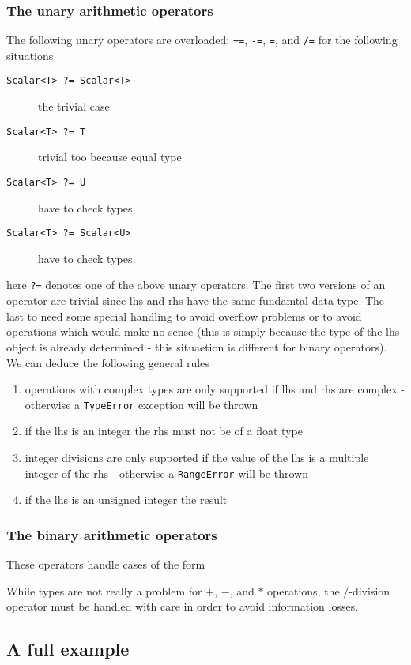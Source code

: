 \subsubsection{The unary arithmetic operators}
The following unary operators are overloaded: {\tt +=}, {\tt -=}, {\tt *=}, and
{\tt /=} for the following situations
\begin{description}
\item[{\tt Scalar<T> ?= Scalar<T>}] the trivial case 
\item[{\tt Scalar<T> ?= T}] trivial too because equal type
\item[{\tt Scalar<T> ?= U}] have to check types
\item[{\tt Scalar<T> ?= Scalar<U>}] have to check types
\end{description}
here {\tt ?=} denotes one of the above unary operators. The first two versions
of an operator are trivial since lhs and rhs have the same fundamtal data
type. The last to need some special handling to avoid overflow problems or 
to avoid operations which would make no sense (this is simply because the 
type of the lhs object is already determined - this situaetion is different 
for binary operators).
We can deduce the following general rules
\begin{enumerate}
  \item operations with complex types are only supported if lhs and rhs are
  complex - otherwise a {\tt TypeError} exception will be thrown
  \item if the lhs is an integer the rhs must not be of a float type
  \item integer divisions are only supported if the value of the lhs is a 
        multiple integer of the rhs - otherwise a {\tt RangeError} will be 
        thrown
  \item if the lhs is an unsigned integer the result 
\end{enumerate}


\subsubsection{The binary arithmetic operators}
These operators handle cases of the form



While types are not really a problem for $+$, $-$, and $*$ operations, the $/$-division operator must be handled with care in order to avoid information 
losses. 

\subsection{A full example}


